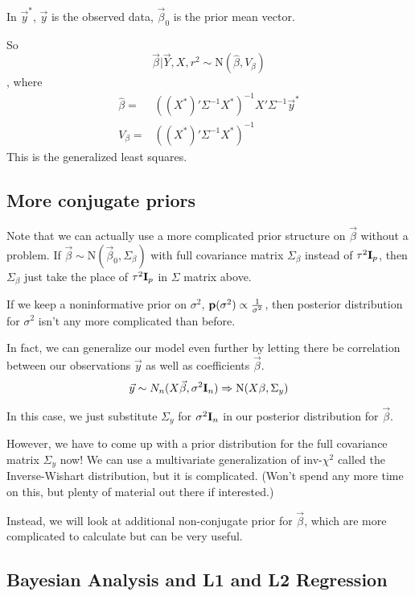 In $\Vec{y}^*$, $\Vec{y}$ is the observed data, $\Vec{\beta}_0$ is the prior mean vector.

So 
\[
\Vec{\beta}| \Vec{Y}, X, r^2 \sim \text{N}(\hat \beta, V_\beta)
\]
, where
\begin{align*}
    \hat{\beta} =& ((X^*)' \Sigma^{-1} X^*)^{-1} X' \Sigma^{-1} \Vec{y}^*\\
    V_\beta =& ((X^*)' \Sigma^{-1} X^*)^{-1}
\end{align*}
This is the generalized least squares.

\subsection{More conjugate priors}

Note that we can actually use a more complicated prior structure on $\Vec{\beta}$ without a problem. If $\Vec{\beta} \sim \text{N}(\Vec{\beta}_0, \Sigma_{\beta})$ with full covariance matrix $\Sigma_\beta$ instead of $\tau^2{\mathbf I}_p$, then $\Sigma_\beta$ just take the place of $\tau^2{\mathbf I}_p$ in $\Sigma$ matrix above.

If we keep a noninformative prior on $\sigma^2$, ${\mathbf p}(\sigma^2) \propto \frac{1}{\sigma^2}$, then posterior distribution for $\sigma^2$ isn't any more complicated than before.

In fact, we can generalize our model even further by letting there be correlation between our observations $\Vec{y}$ as well as coefficients $\Vec{\beta}$.
\[
\Vec{y} \sim N_n(X\Vec{\beta}, \sigma^2 {\mathbf I}_n) \Rightarrow \text{N}(X\beta, \Sigma_y)
\]

In this case, we just substitute $\Sigma_y$ for $\sigma^2{\mathbf I}_n$ in our posterior distribution for $\Vec{\beta}$.

However, we have to come up with a prior distribution for the full covariance matrix $\Sigma_y$ now! We can use a multivariate generalization of inv-$\chi^2$ called the Inverse-Wishart distribution, but it is complicated. (Won't spend any more time on this, but plenty of material out there if interested.)

Instead, we will look at additional non-conjugate prior for $\Vec{\beta}$, which are more \\complicated to calculate but can be very useful.

\subsection{Bayesian Analysis and L1 and L2 Regression}

